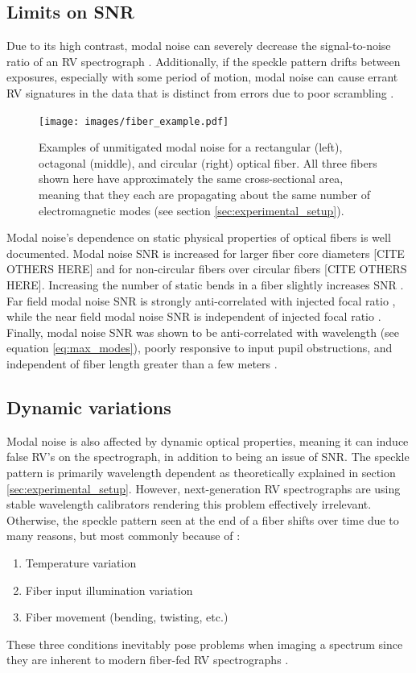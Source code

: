 \documentclass[twocolumn]{emulateapj}
\begin{document}
\subsection{Limits on SNR}
Due to its high contrast, modal noise can severely decrease the signal-to-noise ratio of an RV spectrograph \citep{Epworth1978, Baudrand2001, Lemke2011}. Additionally, if the speckle pattern drifts between exposures, especially with some period of motion, modal noise can cause errant RV signatures in the data that is distinct from errors due to poor scrambling \citep{Mahadevan2014}.

\begin{figure}
\centering
	\texttt{[image: images/fiber\_example.pdf]}
	\caption{Examples of unmitigated modal noise for a rectangular (left), octagonal (middle), and circular (right) optical fiber. All three fibers shown here have approximately the same cross-sectional area, meaning that they each are propagating about the same number of electromagnetic modes (see section \ref{sec:experimental_setup}).}
\label{fig:fiber_example}
\end{figure}

Modal noise's dependence on static physical properties of optical fibers is well documented. Modal noise SNR is increased for larger fiber core diameters \citep{Sablowski2015} [CITE OTHERS HERE] and for non-circular fibers over circular fibers \citep{Sturmer2016, Sablowski2015} [CITE OTHERS HERE]. Increasing the number of static bends in a fiber slightly increases SNR \citep{Imai1979}. Far field modal noise SNR is strongly anti-correlated with injected focal ratio \citep{Sablowski2015}, while the near field modal noise SNR is independent of injected focal ratio \citep{Baudrand2001}. Finally, modal noise SNR was shown to be anti-correlated with wavelength (see equation \ref{eq:max_modes}), poorly responsive to input pupil obstructions, and independent of fiber length greater than a few meters \citep{Baudrand2001}.

\subsection{Dynamic variations}
Modal noise is also affected by dynamic optical properties, meaning it can induce false RV's on the spectrograph, in addition to being an issue of SNR. The speckle pattern is primarily wavelength dependent as theoretically explained in section \ref{sec:experimental_setup}. However, next-generation RV spectrographs are using stable wavelength calibrators rendering this problem effectively irrelevant. Otherwise, the speckle pattern seen at the end of a fiber shifts over time due to many reasons, but most commonly because of \citep{Epworth1978}:
\begin{enumerate}
\item Temperature variation
\item Fiber input illumination variation
\item Fiber movement (bending, twisting, etc.)
\end{enumerate}
These three conditions inevitably pose problems when imaging a spectrum since they are inherent to modern fiber-fed RV spectrographs \citep{Baudrand2001, Mahadevan2014}.
\end{document}
